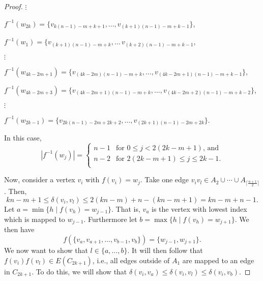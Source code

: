 \documentclass[11pt,a4paper]{article}
\begin{document}
\begin{proof}
$\vdots$

$f^{-1}(w_{2k}) = \{v_{k(n-1)-m+k+1},\ldots,v_{(k+1)(n-1)-m+k-1}\}$,

$f^{-1}(w_1) = \{v_{(k+1)(n-1)-m+k},\ldots\,v_{(k+2)(n-1)-m+k-1}$,

$\vdots$

$f^{-1}(w_{4k-2m+1}) = \{v_{(4k-2m)(n-1)-m+k},\ldots,v_{(4k-2m+1)(n-1)-m+k-1}\}$,

$f^{-1}(w_{4k-2m+3}) = \{v_{(4k-2m+1)(n-1)-m+k},\ldots,v_{(4k-2m+2)(n-1)-m+k-2}\}$,

$\vdots$

$f^{-1}(w_{2k-1}) =\{v_{2k(n-1)-2m+2k+2},\ldots,v_{(2k+1)(n-1)-2m+2k}\}$.

\noindent
In this case,
\[
|f^{-1}(w_j)| = \begin{cases}
  n-1 & \text{for $0 \leq j < 2(2k-m+1)$, and} \\
  n-2 & \text{for $2(2k-m+1) \leq j \leq 2k-1$.} \\
\end{cases}
\]

Now,
consider a vertex $v_i$ with $f(v_i) = w_j$. Take one edge $v_i v_l \in A_2 \cup \cdots \cup A_{\lceil\frac{n+1}{2}\rceil}$. Then,
\begin{equation} \label{eq:deltail}
kn-m+1 \leq \delta(v_i,v_l) \leq 2(kn-m)+n-(kn-m+1)=kn-m+n-1.
\end{equation}
Let $a=\min{\{h \;|\; f(v_h) = w_{j-1} \}}$. That is, $v_a$ is the vertex with lowest index which is mapped to $w_{j-1}$. Furthermore let $b=\max{\{h \;|\; f(v_h) = w_{j+1} \}}$. We then have
\[
f(\{v_a,v_{a+1},\ldots,v_{b-1},v_b\})=\{w_{j-1},w_{j+1}\}.
\]
We now want to show that $l \in \{a, \ldots, b\}$. It will then follow that $f(v_i) f(v_l) \in E(C_{2k+1})$, i.e., all edges outside of $A_1$ are mapped to an edge in $C_{2k+1}$.
To do this, we will show that $\delta(v_i,v_a) \leq \delta(v_i,v_l) \leq \delta(v_i,v_b)$.


\end{proof}
\end{document}
